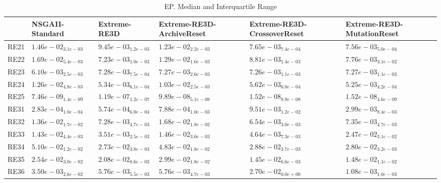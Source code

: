 \documentclass{article}
\begin{document}
\begin{table}
\caption{EP. Median and Interquartile Range}
\label{table: EP}
\centering
\begin{scriptsize}
\begin{tabular}{llllll}
\hline & NSGAII-Standard & Extreme-RE3D & Extreme-RE3D-ArchiveReset & Extreme-RE3D-CrossoverReset &  Extreme-RE3D-MutationReset\\
\hline 
RE21 & $  1.46e-02_{ 3.1e-03}$ & $  9.45e-03_{ 1.2e-03}$ & $  1.23e-02_{ 2.2e-03}$ & \cellcolor{gray25}$  7.65e-03_{ 7.4e-04}$ & \cellcolor{gray95}$  7.56e-03_{ 5.0e-04}$ \\
RE22 & $  1.69e-02_{ 5.4e-03}$ & \cellcolor{gray95}$  7.23e-03_{ 1.0e-03}$ & $  1.29e-02_{ 1.6e-03}$ & $  8.81e-03_{ 1.4e-03}$ & \cellcolor{gray25}$  7.76e-03_{ 3.1e-02}$ \\
RE23 & \cellcolor{gray95}$  6.10e-03_{ 2.5e-03}$ & $  7.28e-03_{ 7.5e-04}$ & $  7.27e-03_{ 2.6e-03}$ & \cellcolor{gray25}$  7.26e-03_{ 1.1e-03}$ & $  7.27e-03_{ 1.1e-03}$ \\
RE24 & $  1.26e-02_{ 4.8e-03}$ & \cellcolor{gray25}$  5.34e-03_{ 6.1e-04}$ & $  1.03e-02_{ 2.5e-03}$ & $  5.62e-03_{ 6.0e-04}$ & \cellcolor{gray95}$  5.25e-03_{ 4.2e-04}$ \\
RE25 & \cellcolor{gray95}$  7.46e-09_{ 1.4e-09}$ & $  1.19e-07_{ 1.2e-07}$ & $  9.89e-08_{ 5.1e-08}$ & $  1.52e-08_{ 8.9e-08}$ & \cellcolor{gray25}$  1.52e-08_{ 4.6e-09}$ \\
RE31 & \cellcolor{gray95}$  2.83e-04_{ 1.0e-04}$ & \cellcolor{gray25}$  5.74e-04_{ 6.0e-04}$ & $  7.88e-04_{ 1.0e-03}$ & $  9.51e-03_{ 1.2e-02}$ & $  2.99e-03_{ 8.4e-03}$ \\
RE32 & $  1.36e-02_{ 1.7e-02}$ & \cellcolor{gray25}$  7.28e-03_{ 4.7e-03}$ & $  1.68e-02_{ 1.8e-02}$ & \cellcolor{gray95}$  6.54e-03_{ 3.0e-03}$ & $  7.35e-03_{ 4.7e-03}$ \\
RE33 & $  1.43e-02_{ 4.4e-03}$ & \cellcolor{gray95}$  3.51e-03_{ 2.5e-03}$ & $  1.46e-02_{ 3.0e-03}$ & \cellcolor{gray25}$  4.64e-03_{ 7.3e-03}$ & $  2.47e-02_{ 3.1e-02}$ \\
RE34 & $  5.10e-02_{ 1.2e-02}$ & \cellcolor{gray95}$  2.73e-02_{ 3.8e-03}$ & $  4.83e-02_{ 1.8e-02}$ & $  2.88e-02_{ 3.7e-03}$ & \cellcolor{gray25}$  2.80e-02_{ 3.2e-03}$ \\
RE35 & $  2.54e-02_{ 3.0e-02}$ & $  2.08e-02_{ 8.6e-03}$ & $  2.99e-02_{ 1.8e-02}$ & \cellcolor{gray95}$  1.45e-02_{ 6.6e-03}$ & \cellcolor{gray25}$  1.48e-02_{ 1.1e-02}$ \\
RE36 & \cellcolor{gray25}$  3.50e-03_{ 2.6e-02}$ & $  5.76e-03_{ 5.5e-03}$ & $  5.76e-03_{ 4.7e-03}$ & $  2.70e-02_{ 0.0e+00}$ & \cellcolor{gray95}$  1.08e-03_{ 1.0e-03}$ \\

\end{tabular}
\end{scriptsize}
\end{table}
\end{document}

